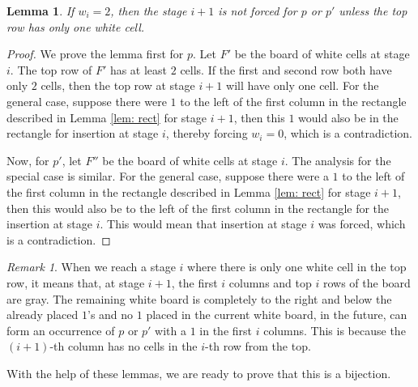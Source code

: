 \documentclass[12pt, english, a4paper]{article}
\theoremstyle{plain}
\newtheorem{lemma}[theorem]{Lemma}
\theoremstyle{definition}
\theoremstyle{remark}
\newtheorem{remark}[theorem]{Remark}
\begin{document}
\begin{lemma}\label{lem: unforced-descent}
    If $w_i=2$, then the stage $i+1$ is not forced for $p$ or $p'$ unless the top row has only one white cell.
\end{lemma}
\begin{proof}
    We prove the lemma first for $p$. Let $F'$ be the board of white cells at stage $i$. The top row of $F'$ has at least $2$ cells. If the first and second row both have only $2$ cells, then the top row at stage $i+1$ will have only one cell. For the general case, suppose there were $1$ to the left of the first column in the rectangle described in Lemma \ref{lem: rect} for stage $i+1$, then this $1$ would also be in the rectangle for insertion at stage $i$, thereby forcing $w_i=0$, which is a contradiction.

    Now, for $p'$, let $F''$ be the board of white cells at stage $i$. The analysis for the special case is similar. For the general case, suppose there were a $1$ to the left of the first column in the rectangle described in Lemma \ref{lem: rect} for stage $i+1$, then this would also be to the left of the first column in the rectangle for the insertion at stage $i$. This would mean that insertion at stage $i$ was forced, which is a contradiction.
\end{proof}

\begin{remark}
    When we reach a stage $i$ where there is only one white cell in the top row, it means that, at stage $i+1$, the first $i$ columns and top $i$ rows of the board are gray. The remaining white board is completely to the right and below the already placed $1$'s and no $1$ placed in the current white board, in the future, can form an occurrence of $p$ or $p'$ with a $1$ in the first $i$ columns. This is because the $(i+1)$-th column has no cells in the $i$-th row from the top.
\end{remark}

With the help of these lemmas, we are ready to prove that this is a bijection.
\end{document}
